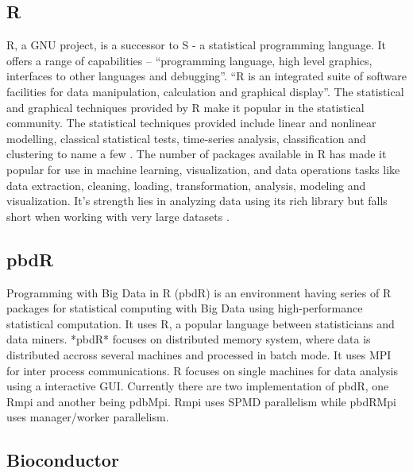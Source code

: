 \subsection{R}

    R, a GNU project, is a successor to S - a statistical programming
    language. It offers a range of capabilities – ``programming
    language, high level graphics, interfaces to other languages and
    debugging''. ``R is an integrated suite of software facilities for
    data manipulation, calculation and graphical display''. The
    statistical and graphical techniques provided by R make it popular
    in the statistical community. The statistical techniques provided
    include linear and nonlinear modelling, classical statistical
    tests, time-series analysis, classification and clustering to name
    a few \cite{www-R}. The number of packages available in R has
    made it popular for use in machine learning, visualization, and
    data operations tasks like data extraction, cleaning, loading,
    transformation, analysis, modeling and visualization. It's
    strength lies in analyzing data using its rich library but falls
    short when working with very large datasets \cite{book-R}.
    
\subsection{pbdR}

    Programming with Big Data in R (pbdR) \cite{www-pbdR} is an
    environment having series of R packages for statistical computing
    with Big Data using high-performance statistical computation. It
    uses R, a popular language between statisticians and data
    miners. *pbdR* focuses on distributed memory system, where data is
    distributed accross several machines and processed in batch
    mode. It uses MPI for inter process communications. R focuses on
    single machines for data analysis using a interactive
    GUI. Currently there are two implementation of pbdR, one Rmpi and
    another being pdbMpi.  Rmpi uses SPMD parallelism while pbdRMpi
    uses manager/worker parallelism.

\subsection{Bioconductor}

